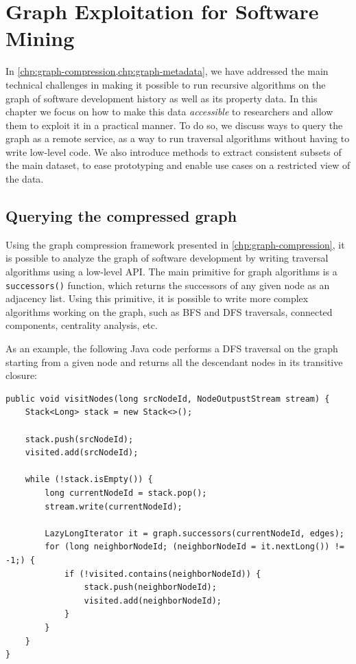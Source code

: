 \chapter{Graph Exploitation for Software Mining}%
\label{chp:graph-exploitation}

In \cref{chp:graph-compression,chp:graph-metadata}, we have addressed the main
technical challenges in making it possible to run recursive algorithms on the
graph of software development history as well as its property data. In this
chapter we focus on how to make this data \emph{accessible} to researchers and
allow them to exploit it in a practical manner. To do so, we discuss ways to
query the graph as a remote service, as a way to run traversal algorithms
without having to write low-level code. We also introduce methods to extract
consistent subsets of the main dataset, to ease prototyping and enable use
cases on a restricted view of the data.

\section{Querying the compressed graph}%
\label{sec:graph-querying}

Using the graph compression framework presented in
\cref{chp:graph-compression}, it is possible to analyze the graph of software
development by writing traversal algorithms using a low-level API\@. The main
primitive for graph algorithms is a \texttt{successors()} function, which
returns the successors of any given node as an adjacency list. Using this
primitive, it is possible to write more complex algorithms working on the
graph, such as \gls{BFS} and \gls{DFS} traversals, connected components,
centrality analysis, etc.

As an example, the following Java code performs a \gls{DFS} traversal on the
graph starting from a given node and returns all the descendant nodes in its
transitive closure:

\begin{verbatim}
public void visitNodes(long srcNodeId, NodeOutpustStream stream) {
    Stack<Long> stack = new Stack<>();

    stack.push(srcNodeId);
    visited.add(srcNodeId);

    while (!stack.isEmpty()) {
        long currentNodeId = stack.pop();
        stream.write(currentNodeId);

        LazyLongIterator it = graph.successors(currentNodeId, edges);
        for (long neighborNodeId; (neighborNodeId = it.nextLong()) != -1;) {
            if (!visited.contains(neighborNodeId)) {
                stack.push(neighborNodeId);
                visited.add(neighborNodeId);
            }
        }
    }
}
\end{verbatim}

